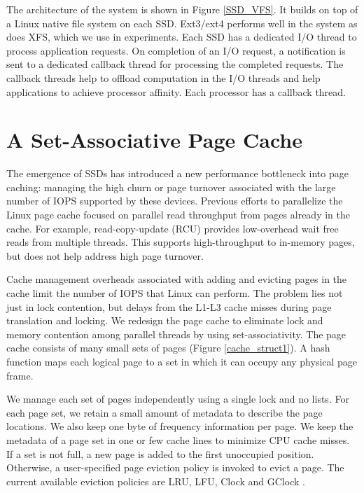 The architecture of the system is shown in Figure \ref{SSD_VFS}.
It builds on top of a Linux native file system on each SSD.
Ext3/ext4 performs well in the system as does XFS, which we use in experiments. 
Each SSD has a dedicated I/O thread to process application requests.
On completion of an I/O request, a notification is sent to a dedicated callback
thread for processing the completed requests. The callback threads help to
offload computation in the I/O threads and help applications to achieve processor
affinity. Each processor has a callback thread.

\section{A Set-Associative Page Cache}

The emergence of SSDs has introduced a new performance bottleneck into
page caching: managing the high churn or page turnover associated with
the large number of IOPS supported by these devices. Previous efforts
to parallelize the Linux page cache focused on parallel read throughput
from pages already in the cache. For example, read-copy-update (RCU) \cite{rcu}
provides low-overhead wait free reads from multiple threads. This supports
high-throughput to in-memory pages, but does not help address high page
turnover.

Cache management overheads associated with adding and evicting pages in
the cache limit the number of IOPS that Linux can perform. The problem lies
not just in lock contention, but delays from the L1-L3 cache misses during
page translation and locking.
We redesign the page cache to eliminate lock and
memory contention among parallel threads by using set-associativity.
The page cache consists of many small sets of pages (Figure \ref{cache_struct1}).
A hash function maps each logical page to a set in which it can occupy
any physical page frame. 

We manage each set of pages independently using a single lock and no lists.
For each page set, we retain a small amount of metadata to describe the page
locations. We also keep one byte of frequency information per page.
We keep the metadata of a page set in one or few cache lines to minimize
CPU cache misses. If a set
is not full, a new page is added to the first unoccupied position. Otherwise,
a user-specified page eviction policy is invoked to evict a page.
The current available eviction policies are LRU, LFU, Clock \cite{clock} and
GClock \cite{gclock}.

